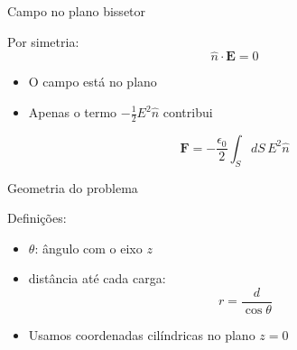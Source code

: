 \documentclass[aspectratio=169,11pt]{beamer}
\begin{document}
\begin{frame}{Campo no plano bissetor}

\begin{mybox}
Por simetria:
\[
\hat n \cdot \mathbf E = 0
\]
\end{mybox}

\begin{itemize}
\item O campo está no plano
\item Apenas o termo $-\frac{1}{2}E^2 \hat n$ contribui
\end{itemize}

\begin{eqbox}
\begin{equation}
\mathbf F =
-\frac{\epsilon_0}{2}
\int_S dS\, E^2 \hat n
\end{equation}
\end{eqbox}

\end{frame}

\begin{frame}{Geometria do problema}

\begin{mybox}
Definições:
\begin{itemize}
\item $\theta$: ângulo com o eixo $z$
\item distância até cada carga:
\[
r = \frac{d}{\cos\theta}
\]
\end{itemize}
\end{mybox}

\begin{itemize}
\item Usamos coordenadas cilíndricas no plano $z=0$
\end{itemize}

\end{frame}
\end{document}
